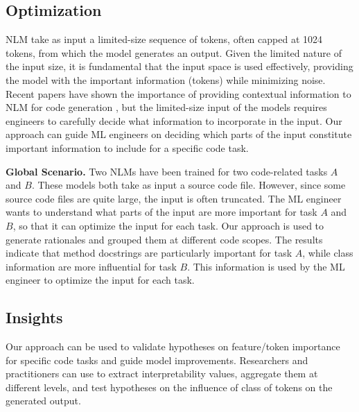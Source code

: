 \subsection{Optimization}
NLM take as input a limited-size sequence of tokens, often capped at 1024 tokens, from which the model generates an output. Given the limited nature of the input size, it is fundamental that the input space is used effectively, providing the model with the important information (tokens) while minimizing noise. Recent papers have shown the importance of providing contextual information to NLM for code generation \cite{clement2021long}, but the limited-size input of the models requires engineers to carefully decide what information to incorporate in the input. Our approach can guide ML engineers on deciding which parts of the input constitute important information to include for a specific code task.

\textbf{Global Scenario.} Two NLMs have been trained for two code-related tasks $A$ and $B$. These models both take as input a source code file. However, since some source code files are quite large, the input is often truncated. The ML engineer wants to understand what parts of the input are more important for task $A$ and $B$, so that it can optimize the input for each task. Our approach is used to generate rationales and grouped them at different code scopes. The results indicate that method docstrings are particularly important for task $A$, while class information are more influential for task $B$. This information is used by the ML engineer to optimize the input for each task. 

\subsection{Insights}
Our approach can be used to validate hypotheses on feature/token importance for specific code tasks and guide model improvements. Researchers and practitioners can use \codeSeqRational to extract interpretability values, aggregate them at different levels, and test hypotheses on the influence of class of tokens on the generated output. 